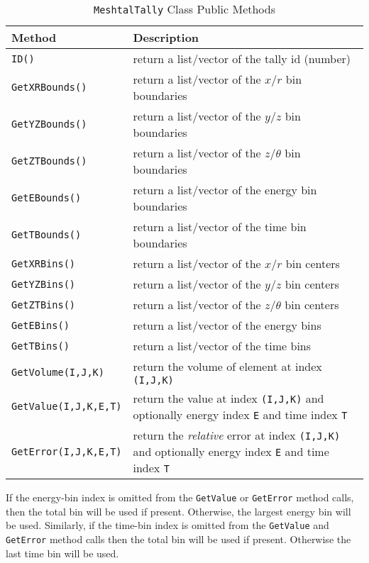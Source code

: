 \documentclass[11pt]{article}
\begin{document}
\begin{table}[]
  \begin{center}
  \caption{\texttt{MeshtalTally} Class Public Methods}
  \label{tab:meshtaltally_class_public_methods}
    \begin{tabular}{lp{4.0in}}
      \toprule
        Method & Description \\
      \midrule
        \texttt{ID()}                & return a list/vector of the tally id (number) \\
        \texttt{GetXRBounds()}       & return a list/vector of the $x$/$r$ bin boundaries \\
        \texttt{GetYZBounds()}       & return a list/vector of the $y$/$z$ bin boundaries \\
        \texttt{GetZTBounds()}       & return a list/vector of the $z$/$\theta$ bin boundaries \\
        \texttt{GetEBounds()}        & return a list/vector of the energy bin boundaries \\
        \texttt{GetTBounds()}        & return a list/vector of the time bin boundaries \\
        \texttt{GetXRBins()}         & return a list/vector of the $x$/$r$ bin centers \\
        \texttt{GetYZBins()}         & return a list/vector of the $y$/$z$ bin centers \\
        \texttt{GetZTBins()}         & return a list/vector of the $z$/$\theta$ bin centers \\
        \texttt{GetEBins()}          & return a list/vector of the energy bins \\
        \texttt{GetTBins()}          & return a list/vector of the time bins \\
        \texttt{GetVolume(I,J,K)}    & return the volume of element at index \texttt{(I,J,K)} \\
        \texttt{GetValue(I,J,K,E,T)} & return the value at index \texttt{(I,J,K)} and optionally energy index \texttt{E} and time index \texttt{T} \\
        \texttt{GetError(I,J,K,E,T)} & return the \emph{relative} error at index \texttt{(I,J,K)} and optionally energy index \texttt{E} and time index \texttt{T} \\
      \bottomrule
    \end{tabular}
  \end{center}
\end{table}

If the energy-bin index is omitted from the \texttt{GetValue} or
\texttt{GetError} method calls, then the total bin will be used if present.
Otherwise, the largest energy bin will be used. Similarly, if the time-bin index
is omitted from the \texttt{GetValue} and \texttt{GetError} method calls then
the total bin will be used if present. Otherwise the last time bin will be used.
\end{document}
